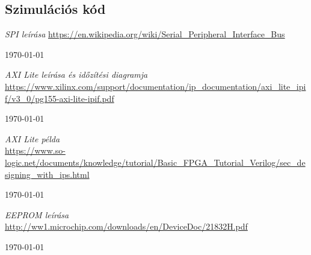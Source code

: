 \documentclass[a4paper,11pt]{article}
\begin{document}


\subsection{Szimulációs kód}



\pagebreak
\begin{thebibliography}{}


\textit{SPI leírása}
\url{https://en.wikipedia.org/wiki/Serial_Peripheral_Interface_Bus}

\today


\textit{AXI Lite leírása és időzítési diagramja}\\
\url{https://www.xilinx.com/support/documentation/ip_documentation/axi_lite_ipif/v3_0/pg155-axi-lite-ipif.pdf}

\today




\textit{AXI Lite példa}\\
\url{https://www.so-logic.net/documents/knowledge/tutorial/Basic_FPGA_Tutorial_Verilog/sec_designing_with_ips.html}

\today


\textit{EEPROM leírása}\\
\url{http://ww1.microchip.com/downloads/en/DeviceDoc/21832H.pdf}

\today

\end{thebibliography}
\end{document}
